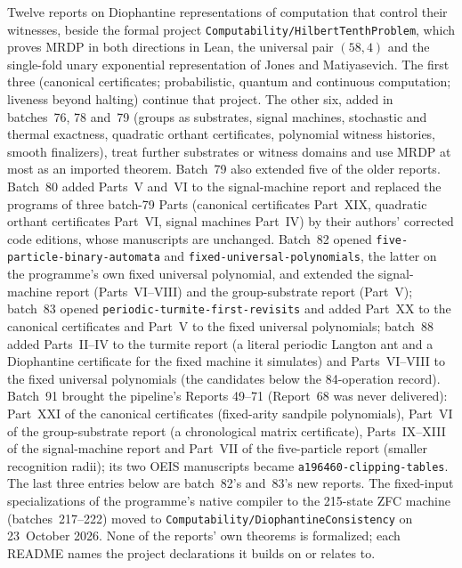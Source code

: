 \documentclass[11pt]{article}
\newcommand{\dir}[1]{\texttt{#1}}
\begin{document}
Twelve reports on Diophantine representations of computation that control
their witnesses, beside the formal project
\dir{Computability/HilbertTenthProblem}, which proves MRDP in both
directions in Lean, the universal pair $(58,4)$ and the single-fold unary
exponential representation of Jones and Matiyasevich.  The first three
(canonical certificates; probabilistic, quantum and continuous computation;
liveness beyond halting) continue that project.  The other six, added in
batches~76, 78 and~79 (groups as substrates, signal machines, stochastic and
thermal exactness, quadratic orthant certificates, polynomial witness
histories, smooth finalizers), treat further substrates or witness domains
and use MRDP at most as an imported theorem.  Batch~79 also extended five
of the older reports.  Batch~80 added Parts~V and~VI to the signal-machine
report and replaced the programs of three batch-79 Parts (canonical
certificates Part~XIX, quadratic orthant certificates Part~VI, signal
machines Part~IV) by their authors' corrected code editions, whose
manuscripts are unchanged.  Batch~82 opened
\dir{five-particle-binary-automata} and \dir{fixed-universal-polynomials},
the latter on the programme's own fixed universal polynomial, and extended
the signal-machine report (Parts~VI--VIII) and the group-substrate report
(Part~V); batch~83 opened \dir{periodic-turmite-first-revisits} and added
Part~XX to the canonical certificates and Part~V to the fixed universal
polynomials; batch~88 added Parts~II--IV to the turmite report (a literal
periodic Langton ant and a Diophantine certificate for the fixed machine it
simulates) and Parts~VI--VIII to the fixed universal polynomials (the
candidates below the 84-operation record).  Batch~91 brought the
pipeline's Reports 49--71 (Report~68 was never delivered): Part~XXI of the
canonical certificates (fixed-arity sandpile polynomials), Part~VI of the
group-substrate report (a chronological matrix certificate), Parts~IX--XIII
of the signal-machine report and Part~VII of the five-particle report
(smaller recognition radii); its two OEIS manuscripts became
\dir{a196460-clipping-tables}.  The last three entries below
are batch~82's and~83's new reports.  The fixed-input
specializations of the programme's native compiler to the 215-state ZFC
machine (batches~217--222) moved to
\dir{Computability/DiophantineConsistency} on 23~October 2026.  None of the
reports' own theorems is formalized; each README names the project
declarations it builds on or relates to.
\end{document}
